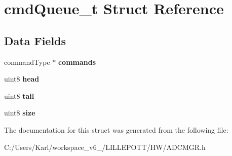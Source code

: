 \hypertarget{structcmd_queue__t}{}\section{cmd\+Queue\+\_\+t Struct Reference}
\label{structcmd_queue__t}
\subsection*{Data Fields}
\begin{DoxyCompactItemize}
\item 
\mbox{\label{structcmd_queue__t_ab0c685bdd8ab7b18cb56c909e479bf6e}} 
command\+Type $\ast$ {\bfseries commands}
\item 
\mbox{\label{structcmd_queue__t_afd7e07fd89d37728eaa1d5300e4c73e9}} 
uint8 {\bfseries head}
\item 
\mbox{\label{structcmd_queue__t_a5364ea4ecf1fd8513425b21373d152cc}} 
uint8 {\bfseries tail}
\item 
\mbox{\label{structcmd_queue__t_abf7f47b9039221e81ecb5eac8f3b090d}} 
uint8 {\bfseries size}
\end{DoxyCompactItemize}


The documentation for this struct was generated from the following file\+:\begin{DoxyCompactItemize}
\item 
C\+:/\+Users/\+Karl/workspace\+\_\+v6\+\_/\+L\+I\+L\+L\+E\+P\+O\+T\+T/\+H\+W/A\+D\+C\+M\+G\+R.\+h\end{DoxyCompactItemize}
